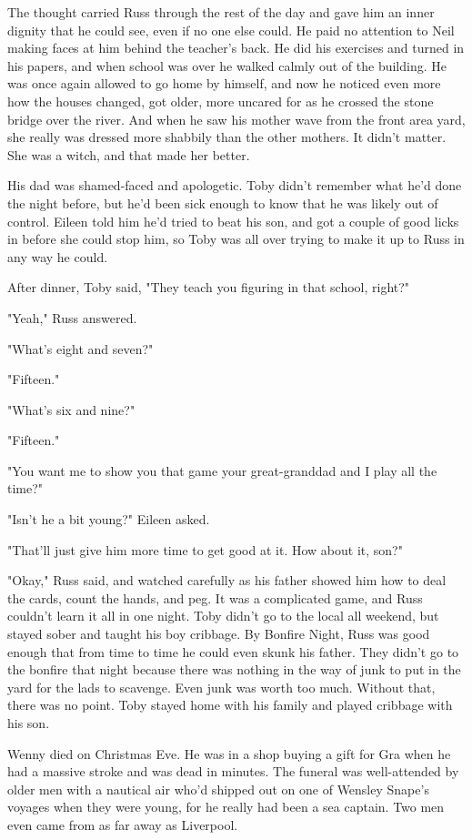 The thought carried Russ through the rest of the day and gave him an inner dignity that he could see, even if no one else could. He paid no attention to Neil making faces at him behind the teacher's back. He did his exercises and turned in his papers, and when school was over he walked calmly out of the building. He was once again allowed to go home by himself, and now he noticed even more how the houses changed, got older, more uncared for as he crossed the stone bridge over the river. And when he saw his mother wave from the front area yard, she really was dressed more shabbily than the other mothers. It didn't matter. She was a witch, and that made her better.

His dad was shamed-faced and apologetic. Toby didn't remember what he'd done the night before, but he'd been sick enough to know that he was likely out of control. Eileen told him he'd tried to beat his son, and got a couple of good licks in before she could stop him, so Toby was all over trying to make it up to Russ in any way he could.

After dinner, Toby said, "They teach you figuring in that school, right?"

"Yeah," Russ answered.

"What's eight and seven?"

"Fifteen."

"What's six and nine?"

"Fifteen."

"You want me to show you that game your great-granddad and I play all the time?"

"Isn't he a bit young?" Eileen asked.

"That'll just give him more time to get good at it. How about it, son?"

"Okay," Russ said, and watched carefully as his father showed him how to deal the cards, count the hands, and peg. It was a complicated game, and Russ couldn't learn it all in one night. Toby didn't go to the local all weekend, but stayed sober and taught his boy cribbage. By Bonfire Night, Russ was good enough that from time to time he could even skunk his father. They didn't go to the bonfire that night because there was nothing in the way of junk to put in the yard for the lads to scavenge. Even junk was worth too much. Without that, there was no point. Toby stayed home with his family and played cribbage with his son.

Wenny died on Christmas Eve. He was in a shop buying a gift for Gra when he had a massive stroke and was dead in minutes. The funeral was well-attended by older men with a nautical air who'd shipped out on one of Wensley Snape's voyages when they were young, for he really had been a sea captain. Two men even came from as far away as Liverpool.

